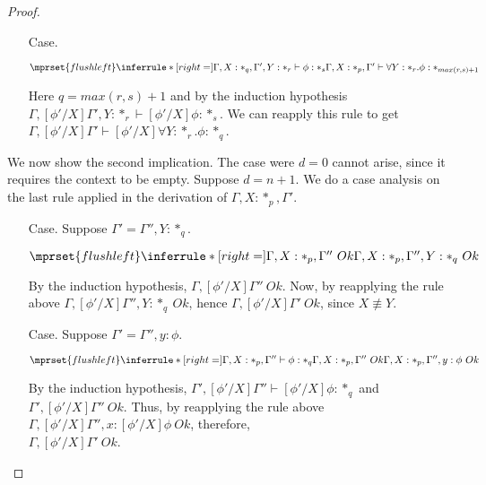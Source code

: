 \begin{proof}
\begin{itemize}
  \item[Case.]\ \\
    \begin{center}
      \begin{math}
        $$\mprset{flushleft}
        \inferrule* [right=] {
          \Gamma,X : *_q,\Gamma',Y:*_r \vdash \phi : *_s
        }{\Gamma,X:*_p,\Gamma' \vdash \forall Y:*_r.\phi : *_{max(r,s)+1}}
      \end{math}
    \end{center}
    Here $q = max(r,s) + 1$ and by the induction hypothesis 
    $\Gamma,[\phi'/X]\Gamma',Y:*_r \vdash [\phi'/X]\phi:*_s$.  We can reapply this rule to get 
    $\Gamma,[\phi'/X]\Gamma' \vdash [\phi'/X] \forall Y:*_r.\phi:*_q$.
  \end{itemize}

  \noindent We now show the second implication.
  The case were $d = 0$ cannot arise, since it requires the context to be empty.
  Suppose $d = n + 1$.  We do a case analysis on the last rule applied in the derivation of 
  $\Gamma,X:*_p,\Gamma'$.
  \begin{itemize}
  \item[Case.] Suppose $\Gamma' = \Gamma'',Y:*_q$.\ \\
    \begin{center}
      \begin{math}
        $$\mprset{flushleft}
        \inferrule* [right=] {
          \Gamma,X:*_p,\Gamma''\ Ok
        }{\Gamma,X:*_p,\Gamma'',Y:*_q\ Ok}
      \end{math}
    \end{center}
    By the induction hypothesis, $\Gamma,[\phi'/X]\Gamma''\ Ok$.  Now, by reapplying
    the rule above $\Gamma,[\phi'/X]\Gamma'',Y:*_q\ Ok$, hence $\Gamma,[\phi'/X]\Gamma'\ Ok$, 
    since $X \not \equiv Y$.
  \item[Case.]Suppose $\Gamma' = \Gamma'',y:\phi$.\ \\
    \begin{center}
      \begin{math}
        $$\mprset{flushleft}
        \inferrule* [right=] {
          \Gamma,X:*_p,\Gamma'' \vdash \phi:*_q
          \\
          \Gamma,X:*_p,\Gamma''\ Ok
        }{\Gamma,X:*_p,\Gamma'',y :\phi\ Ok}
      \end{math} 
    \end{center}
    By the induction hypothesis, $\Gamma',[\phi'/X]\Gamma'' \vdash [\phi'/X]\phi:*_q$ and 
    $\Gamma',[\phi'/X]\Gamma''\ Ok$.  Thus,
    by reapplying the rule above $\Gamma,[\phi'/X]\Gamma'',x:[\phi'/X]\phi\ Ok$, therefore,\\
    $\Gamma,[\phi'/X]\Gamma'\ Ok$.
  \end{itemize}
\end{proof}

